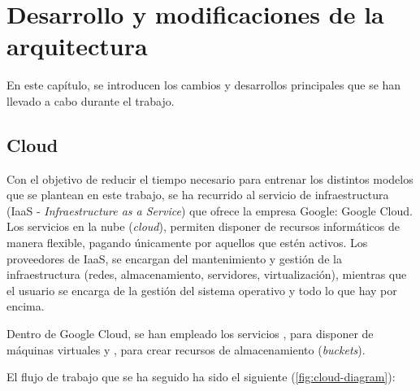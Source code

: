 \section{Desarrollo y modificaciones de la arquitectura}

En este capítulo, se introducen los cambios y desarrollos principales que se han llevado a cabo durante el trabajo.

\subsection{Cloud} 

Con el objetivo de reducir el tiempo necesario para entrenar los distintos modelos que se plantean en este trabajo, se ha recurrido al servicio de infraestructura (IaaS - \textit{Infraestructure as a Service}) que ofrece la empresa Google: Google Cloud. Los servicios en la nube (\textit{cloud}), permiten disponer de recursos informáticos de manera flexible, pagando únicamente por aquellos que estén activos. Los proveedores de IaaS, se encargan del mantenimiento y gestión de la infraestructura (redes, almacenamiento, servidores, virtualización), mientras que el usuario se encarga de la gestión del sistema operativo y todo lo que hay por encima. 

Dentro de Google Cloud, se han empleado los servicios , para disponer de máquinas virtuales y , para crear recursos de almacenamiento (\textit{buckets}).

El flujo de trabajo que se ha seguido ha sido el siguiente (\ref{fig:cloud-diagram}):

